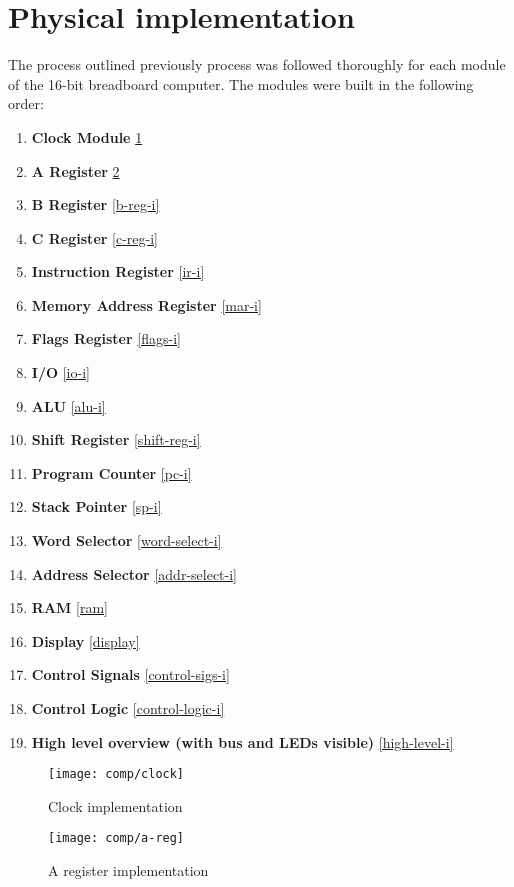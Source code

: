 \section{Physical implementation}
The process outlined previously process was followed thoroughly for each module of the 16-bit
breadboard computer. The modules were built in the following order:
\begin{enumerate}
  \item \textbf{Clock Module} \ref{clock-i}
  \item \textbf{A Register} \ref{a-reg-i}
  \item \textbf{B Register} \ref{b-reg-i}
  \item \textbf{C Register} \ref{c-reg-i}
  \item \textbf{Instruction Register} \ref{ir-i}
  \item \textbf{Memory Address Register} \ref{mar-i}
  \item \textbf{Flags Register} \ref{flags-i}
  \item \textbf{I/O} \ref{io-i}
  \item \textbf{ALU} \ref{alu-i}
  \item \textbf{Shift Register} \ref{shift-reg-i}
  \item \textbf{Program Counter} \ref{pc-i}
  \item \textbf{Stack Pointer} \ref{sp-i}
  \item \textbf{Word Selector} \ref{word-select-i}
  \item \textbf{Address Selector} \ref{addr-select-i}
  \item \textbf{RAM} \ref{ram}
  \item \textbf{Display} \ref{display}
  \item \textbf{Control Signals} \ref{control-sigs-i}
  \item \textbf{Control Logic} \ref{control-logic-i}
  \item \textbf{High level overview (with bus and LEDs visible)} \ref{high-level-i}
\end{enumerate}


  \begin{figure}[h]
    \centering
    \texttt{[image: comp/clock]}
    \caption{Clock implementation}
    \label{clock-i}
  \end{figure}

  \begin{figure}[h]
    \centering
    \texttt{[image: comp/a-reg]}
    \caption{A register implementation}
    \label{a-reg-i}
  \end{figure}

